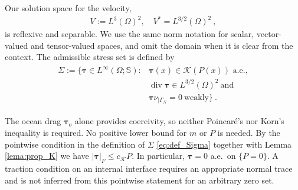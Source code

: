 \documentclass{article}
\theoremstyle{definition}
\newcommand{\bftau}{\boldsymbol{\tau}}
\newcommand{\K}{\mathcal{K}}
\renewcommand\div{\operatorname{\mathrm{div}}}
\begin{document}
Our solution space for the velocity,
\begin{align*}
    V := L^3(\Omega)^2, \quad V^* = L^{3/2}(\Omega)^2 \ ,
\end{align*}
is reflexive and separable. We use the same norm notation for scalar,
vector-valued and tensor-valued spaces, and omit the domain when it is clear
from the context. The admissible stress set is defined by
\begin{align}
    \begin{split}
    \Sigma := \{ \bftau \in L^\infty(\Omega; \mathbb S) : {}&\bftau(x) \in \K(P(x)) \text{ a.e.},\\
    &\div \bftau \in L^{3/2}(\Omega)^2 \ \text{and}\\
    &\bftau\nu_{|\Gamma_N} = 0 \ \text{weakly} \} \ .
    \end{split}\label{eq:def_Sigma}
\end{align}

The ocean drag $\bftau_o$ alone provides coercivity, so neither Poincar\'e's nor Korn's inequality is required. No positive lower bound for $m$ or $P$ is needed. By the pointwise condition in the definition of $\Sigma$ \eqref{eq:def_Sigma} together with Lemma \ref{lema:prop_K} we have $|\bftau|_F\leq c_\K P$. In particular, $\bftau=0$ a.e.\ on $\{P=0\}$. A traction condition on an
internal interface requires an appropriate normal trace and is not inferred
from this pointwise statement for an arbitrary zero set.
\end{document}

